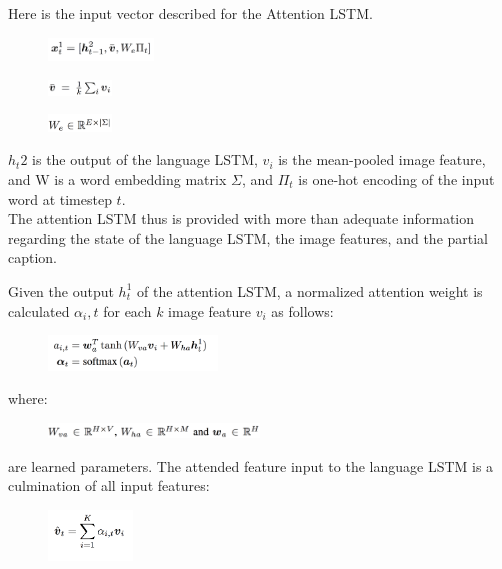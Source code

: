 \documentclass[a4paper]{article}
\begin{document}
Here is the input vector described for the Attention LSTM. 
\begin{figure}[H]
\centering
\includegraphics[width=0.25\textwidth]{b.png}
\end{figure}
\begin{figure}[H]
\centering
\includegraphics[width=0.15\textwidth]{a.png}
\end{figure}
\begin{figure}[H]
\centering
\includegraphics[width=0.15\textwidth]{c.png}
\end{figure}
$h_t2$ is the output of the language LSTM, $v_i$ is the mean-pooled image feature, and W is a word embedding matrix $\Sigma$, and $\Pi_t$ is one-hot encoding of the input word
at timestep $t$.
\\
\noindent 
The attention LSTM thus is provided with more than adequate information regarding the state of the language LSTM, the image features, and the partial caption.

Given the output $h_t^1$ of the attention LSTM, a normalized attention weight is calculated $\alpha_i,t$ for
each $k$ image feature $v_i$ as follows:

\begin{figure}[H]
\centering
\includegraphics[width=0.4\textwidth]{d.png}
\end{figure}

\noindent where:

\begin{figure}[H]
\centering
\includegraphics[width=0.5\textwidth]{e.png}
\end{figure}

\noindent are
learned parameters. The attended feature  input
to the language LSTM is a culmination of all input features:
\begin{figure}[H]
\centering
\includegraphics[width=0.2\textwidth]{f.png}
\end{figure}
\end{document}
